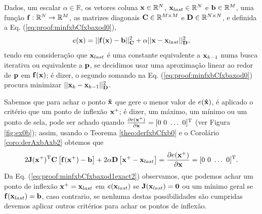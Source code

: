 \begin{myproofT}\label{proof:theo:minfxbCfxbaxod}
Dados,
um escalar $\alpha\in \mathbb{R}$,
os vetores coluna $\VECTOR{x}\in \mathbb{R}^N$, 
$\VECTOR{x}_{last}\in \mathbb{R}^N$ e
$\VECTOR{b}\in \mathbb{R}^M$,  
uma função $\VECTOR{f}:\mathbb{R}^{N} \rightarrow \mathbb{R}^{M}$, 
as matrizes diagonais $\MATRIX{C} \in \mathbb{R}^{M\times M}$ e $\MATRIX{D} \in \mathbb{R}^{N\times N}$, e 
definida a Eq. (\ref{eq:proof:minfxbCfxbaxod0}),
\begin{equation}\label{eq:proof:minfxbCfxbaxod0}
e(\VECTOR{x})=||\VECTOR{f}(\VECTOR{x})-\VECTOR{b}||_{\MATRIX{C}}^2+\alpha||\VECTOR{x}-\VECTOR{x}_{last}||_{\MATRIX{D}}^2,
\end{equation}
tendo em consideração que $\VECTOR{x}_{last}$ é uma constante equivalente a $\VECTOR{x}_{k-1}$
numa busca iterativa ou equivalente a $\VECTOR{p}$, 
se decidimos usar uma aproximação linear ao redor de $\VECTOR{p}$ em $\VECTOR{f}(\VECTOR{x})$; 
é dizer, o segundo somando na Eq. (\ref{eq:proof:minfxbCfxbaxod0}) 
procura minimizar $||\VECTOR{x}_{k}-\VECTOR{x}_{k-1}||_{\MATRIX{D}}^2$.

Sabemos que para achar o ponto $\VECTOR{\hat{x}}$ que gere o menor valor de $e(\VECTOR{\hat{x}})$, é aplicado
o critério que um ponto de inflexão $\VECTOR{x}^+$; é dizer, um máximo, um mínimo ou um ponto de sela, pode ser achado quando 
$\frac{\partial e(\VECTOR{x}^+)}{\partial \VECTOR{x} }=[0~ 0~ \hdots~ 0 ]^{\transpose}$ (ver Figura \ref{fig:ex0b});
assim, usando o Teorema \ref{theo:derfxbCfxb0} e o Corolário \ref{coro:derAxbAxb2} obtemos que
\begin{equation}\label{eq:proof:minfxbCfxbaxod1exact2}
2 \MATRIX{J}(\VECTOR{x}^+)^{\transpose}\MATRIX{C}\left[ \VECTOR{f}(\VECTOR{x}^+)-\VECTOR{b} \right] +
2 \alpha\MATRIX{D}\left[\VECTOR{x}^+-\VECTOR{x}_{last}\right]
=
\frac{\partial e(\VECTOR{x}^+)}{\partial \VECTOR{x} }=[0~ 0~ \hdots~ 0 ]^{\transpose}.
\end{equation}
Da Eq. (\ref{eq:proof:minfxbCfxbaxod1exact2}) observamos, 
que podemos achar um ponto de inflexão $\VECTOR{x}^+=\VECTOR{x}_{last}$
em $e(\VECTOR{x}_{last})$ se 
$\MATRIX{J}(\VECTOR{x}_{last})  = \MATRIX{0}$ ou um mínimo geral se $\VECTOR{f}(\VECTOR{x}_{last})=\VECTOR{b}$,
caso contrario, 
se nenhuma destas possibilidades são cumpridas devemos aplicar outros critérios para achar os pontos de inflexão.




\end{myproofT}
